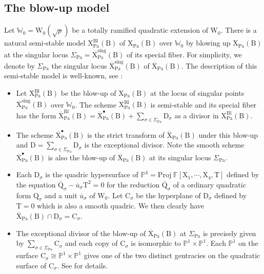 \documentclass[10pt]{amsart}
\numberwithin{equation}{section}
\theoremstyle{definition}
\def\Pa{\mathrm{Pa}}
\def\FF{\mathbb{F}}
\def\PP{\mathbb{P}}
\def\rmB{\mathrm{B}}
\def\rmC{\mathrm{C}}
\def\rmD{\mathrm{D}}
\def\rmQ{\mathrm{Q}}
\def\rmW{\mathrm{W}}
\def\rmX{\mathrm{X}}
\def\rmT{\mathrm{T}}
\begin{document}
\subsection{The blow-up  model}
Let $\mathbb{W}_{0}=\rmW_{0}(\sqrt{p})$ be a totally ramified quadratic extension of $\rmW_{0}$. There is a natural semi-stable model  $\rmX^{\mathrm{Bl}}_{\Pa}(\rmB)$ of $\rmX_{\Pa}(\rmB)$ over $\mathbb{W}_{0}$ by blowing up $\rmX_{\Pa}(\rmB)$ at  the singular locus $\Sigma_{\Pa}=\overline{\rmX}^{\mathrm{sing}}_{\Pa}(\rmB)$ of its special fiber. For simplicity, we denote by $\Sigma_{\Pa}$ the singular locus $\overline{\rmX}^{\mathrm{sing}}_{\Pa}(\rmB)$ of $\overline{\rmX}_{\Pa}(\rmB)$. The description of this semi-stable model is well-known, see \cite[Proposition 2.4]{Illusie-van}:
\begin{itemize}
\item Let $\rmX^{\mathrm{Bl}}_{\Pa}(\rmB)$ be the blow-up of  $\rmX_{\Pa}(\rmB)$ at the locus of singular points $\overline{\rmX}^{\mathrm{sing}}_{\Pa}(\rmB)$ over $\mathbb{W}_{0}$. The scheme  $\rmX^{\mathrm{Bl}}_{\Pa}(\rmB)$ is semi-stable and its special fiber has the form  $\overline{\rmX}^{\mathrm{Bl}}_{\Pa}(\rmB)=\overline{\rmX}^{\bullet}_{\Pa}(\rmB)+ \sum\limits_{\sigma\in\Sigma_{\Pa}}\rmD_{\sigma}$ as a divisor in $\rmX^{\mathrm{Bl}}_{\Pa}(\rmB)$. 
\item The scheme $\overline{\rmX}^{\bullet}_{\Pa}(\rmB)$ is the strict transform of $\overline{\rmX}_{\Pa}(\rmB)$ under this blow-up and $\rmD=\sum\limits_{\sigma\in\Sigma_{\Pa}}\rmD_{\sigma}$ is the exceptional divisor. Note the smooth scheme $\overline{\rmX}^{\bullet}_{\Pa}(\rmB)$ is also the blow-up of $\overline{\rmX}_{\Pa}(\rmB)$ at its singular locus $\Sigma_{\Pa}$.
\item Each $\rmD_{\sigma}$ is the quadric hypersurface of $\PP^{4}=\mathrm{Proj}\phantom{.}\FF[\rmX_{1},\cdots, \rmX_{4}, \rmT]$ defined by the equation $\overline{\rmQ}_{\sigma}-\overline{u}_{\sigma}\rmT^{2}=0$ for the reduction $\overline{\rmQ}_{\sigma}$ of a ordinary quadratic form $\rmQ_{\sigma}$ and a unit $\overline{u}_{\sigma}$ of $\rmW_{0}$. Let $\rmC_{\sigma}$ be the hyperplane of $\rmD_{\sigma}$ defined by $\rmT=0$ which is also a  smooth quadric. We then clearly have $\overline{\rmX}_{\Pa}(\rmB )\cap \rmD_{\sigma}=\rmC_{\sigma}$. 
\item The exceptional divisor of the blow-up of $\overline{\rmX}_{\Pa}(\rmB)$ at $\Sigma_{\Pa}$ is precisely given by $\sum\limits_{\sigma\in\Sigma_{\Pa}}\rmC_{\sigma}$ and each copy of $\rmC_{\sigma}$ is isomorphic to $\PP^{1}\times\PP^{1}$. Each $\PP^{1}$ on the surface $\rmC_{\sigma}\cong\PP^{1}\times\PP^{1}$ gives one of the two distinct gentracies on the quadratic surface of $\rmC_{\sigma}$. See \cite[XII \S 2]{SGA7} for details.
\end{itemize} 
\end{document}
